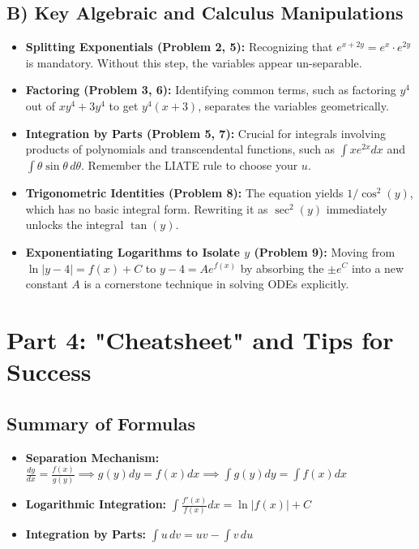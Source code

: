 \documentclass[11pt]{article}
\begin{document}
\subsection{B) Key Algebraic and Calculus Manipulations}
\begin{itemize}
    \item \textbf{Splitting Exponentials (Problem 2, 5):} Recognizing that $e^{x+2y} = e^x \cdot e^{2y}$ is mandatory. Without this step, the variables appear un-separable.
    \item \textbf{Factoring (Problem 3, 6):} Identifying common terms, such as factoring $y^4$ out of $xy^4 + 3y^4$ to get $y^4(x+3)$, separates the variables geometrically.
    \item \textbf{Integration by Parts (Problem 5, 7):} Crucial for integrals involving products of polynomials and transcendental functions, such as $\int x e^{2x} dx$ and $\int \theta \sin\theta \, d\theta$. Remember the LIATE rule to choose your $u$.
    \item \textbf{Trigonometric Identities (Problem 8):} The equation yields $1/\cos^2(y)$, which has no basic integral form. Rewriting it as $\sec^2(y)$ immediately unlocks the integral $\tan(y)$.
    \item \textbf{Exponentiating Logarithms to Isolate $y$ (Problem 9):} Moving from $\ln|y-4| = f(x) + C$ to $y - 4 = A e^{f(x)}$ by absorbing the $\pm e^C$ into a new constant $A$ is a cornerstone technique in solving ODEs explicitly.
\end{itemize}

\newpage
\section{Part 4: "Cheatsheet" and Tips for Success}

\subsection{Summary of Formulas}
\begin{itemize}
    \item \textbf{Separation Mechanism:} $\frac{dy}{dx} = \frac{f(x)}{g(y)} \implies g(y)dy = f(x)dx \implies \int g(y)dy = \int f(x)dx$
    \item \textbf{Logarithmic Integration:} $\int \frac{f'(x)}{f(x)} dx = \ln|f(x)| + C$
    \item \textbf{Integration by Parts:} $\int u \, dv = uv - \int v \, du$
\end{itemize}
\end{document}
